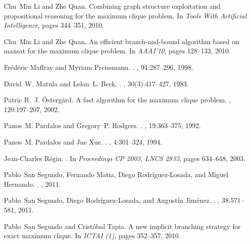 \documentclass{l4proj}
\begin{document}
\begin{thebibliography}{10}
Chu~Min Li and Zhe Quan.
\newblock Combining graph structure exploitation and propositional reasoning
  for the maximum clique problem.
\newblock In {\em Tools With Artificial Intelligence}, pages 344--351, 2010.

Chu~Min Li and Zhe Quan.
\newblock An efficient branch-and-bound algorithm based on maxsat for the
  maximum clique problem.
\newblock In {\em AAAI'10}, pages 128--133, 2010.

Fr\'{e}d\'{e}ric Maffray and Myriam Preissmann.
.
, 94:287--296, 1998.

David~W. Matula and Lelan~L. Beck.
.
,
  30(3):417--427, 1983.

Patric R.~J. \"{O}sterg\aa{}rd.
\newblock A fast algorithm for the maximum clique problem.
, 120:197--207, 2002.

Panos~M. Pardalos and Gregory~P. Rodgers.
.
, 19:363--375, 1992.

Panos~M. Pardalos and Jue Xue.
.
, 4:301--324, 1994.

Jean-Charles R\'{e}gin.
.
\newblock In {\em Proceedings {CP 2003}, LNCS 2833}, pages 634--648, 2003.

Pablo~San Segundo, Fernando Matia, Diego Rodr\'{i}guez-Losada, and Miguel
  Hernando.
.
, 2011.

Pablo~San Segundo, Diego Rodr\'{i}guez-Losada, and August\'{i}n Jim\'{e}nez.
.
, 38:571--581, 2011.

Pablo~San Segundo and Crist{\'o}bal Tapia.
\newblock A new implicit branching strategy for exact maximum clique.
\newblock In {\em ICTAI (1)}, pages 352--357, 2010.


\end{thebibliography}
\end{document}

